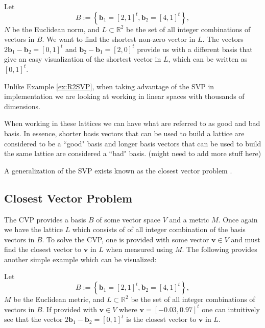 \begin{example}\label{ex:R2SVP}
    Let 
    \[
        B := \left\{\mathbf{b}_1 = [2, 1]^t, \mathbf{b}_2 = [4, 1]^t\right\},
    \]
    $N$ be the Euclidean norm, and $L \subset \mathbb{R}^2$ be the set of all integer combinations of vectors in $B$. We want to find the shortest non-zero vector in $L$. The vectors $2\mathbf{b}_1 - \mathbf{b}_2 = [0, 1]^t$ and $\mathbf{b}_2 - \mathbf{b}_1 = [2, 0]^t$ provide us with a different basis that give an easy visualization of the shortest vector in $L$, which can be written as $[0, 1]^t$.
\end{example}

Unlike Example \ref{ex:R2SVP}, when taking advantage of the SVP in implementation we are looking at working in linear spaces with thousands of dimensions. 

When working in these lattices we can have what are referred to as good and bad basis. In essence, shorter basis vectors that can be used to build a lattice are considered to be a ``good" basis and longer basis vectors that can be used to build the same lattice are considered a ``bad" basis. \color{red} (might need to add more stuff here) \color{black}

A generalization of the SVP exists known as the closest vector problem \cite{micciancio2012complexity}.

\subsection{Closest Vector Problem}

The CVP provides a basis $B$ of some vector space $V$ and a metric $M$. Once again we have the lattice $L$ which consists of of all integer combination of the basis vectors in $B$. To solve the CVP, one is provided with some vector $\mathbf{v} \in V$ and must find the closest vector to $\mathbf{v}$ in $L$ when measured using $M$. The following provides another simple example which can be visualized:

\begin{example}\label{ex:R2CVP}
    Let
    \[
        B := \left\{\mathbf{b}_1 = [2, 1]^t, \mathbf{b}_2 = [4, 1]^t\right\},
    \]
    $M$ be the Euclidean metric, and $L \subset \mathbb{R}^2$ be the set of all integer combinations of vectors in $B$. If provided with $\mathbf{v} \in V$ where $\mathbf{v} = [-0.03, 0.97]^t$ one can intuitively see that the vector $2\mathbf{b}_1 - \mathbf{b}_2 = [0, 1]^t$ is the closest vector to $\mathbf{v}$ in $L$.
\end{example}


